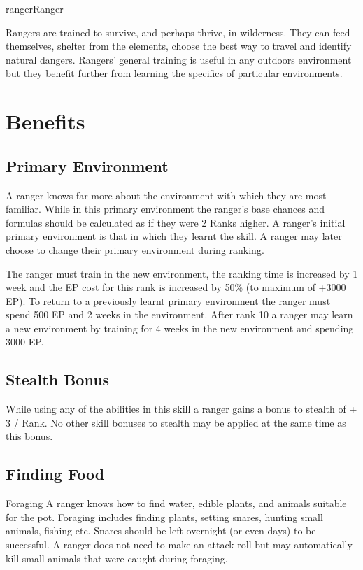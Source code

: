 \begin{Skill}[2.1]{ranger}{Ranger}

Rangers are trained to survive, and perhaps thrive, in wilderness.
They can feed themselves, shelter from the elements, choose the best
way to travel and identify natural dangers.  Rangers’ general training
is useful in any outdoors environment but they benefit further from
learning the specifics of particular environments.

\section{Benefits}

\subsection{Primary Environment}

A ranger knows far more about the environment with which they are most
familiar.  While in this primary environment the ranger’s base chances
and formulas should be calculated as if they were 2 Ranks higher.  A
ranger’s initial primary environment is that in which they learnt
the skill.  A ranger may later choose to change their primary
environment during ranking.

The ranger must train in the new environment, the ranking time is
increased by 1 week and the EP cost for this rank is increased by 50\%
(to maximum of +3000 EP).  To return to a previously learnt primary
environment the ranger must spend 500 EP and 2 weeks in the
environment.  After rank 10 a ranger may learn a new environment by
training for 4 weeks in the new environment and spending 3000 EP.

\subsection{Stealth Bonus}

While using any of the abilities in this skill a ranger gains a bonus
to stealth of + 3 / Rank.  No other skill bonuses to stealth may be
applied at the same time as this bonus.

\subsection{Finding Food}

\begin{Description}
\item[Foraging] A ranger knows how to find water, edible plants, and
  animals suitable for the pot. Foraging includes finding plants,
  setting snares, hunting small animals, fishing etc.  Snares should
  be left overnight (or even days) to be successful. A ranger does not
  need to make an attack roll but may automatically kill small
  animals that were caught during foraging.


\end{Description}
\end{Skill}
